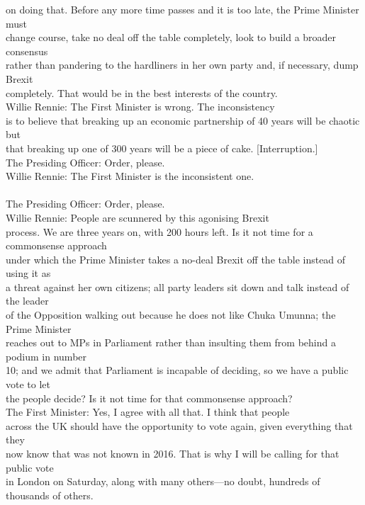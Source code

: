 \documentclass{article}
\begin{document}
\begin{description}
{on doing that. Before any more time passes and it is too late, the Prime Minister must\\
change course, take no deal off the table completely, look to build a broader consensus\\
rather than pandering to the hardliners in her own party and, if necessary, dump Brexit\\
completely. That would be in the best interests of the country.\\
Willie Rennie: The First Minister is wrong. The inconsistency\\
is to believe that breaking up an economic partnership of 40 years will be chaotic but\\
that breaking up one of 300 years will be a piece of cake. [Interruption.]\\
The Presiding Officer: Order, please.\\
Willie Rennie: The First Minister is the inconsistent one.\\
[Interruption.]\\
The Presiding Officer: Order, please.\\
Willie Rennie: People are scunnered by this agonising Brexit\\
process. We are three years on, with 200 hours left. Is it not time for a commonsense approach\\
under which the Prime Minister takes a no-deal Brexit off the table instead of using it as\\
a threat against her own citizens; all party leaders sit down and talk instead of the leader\\
of the Opposition walking out because he does not like Chuka Umunna; the Prime Minister\\
reaches out to MPs in Parliament rather than insulting them from behind a podium in number\\
10; and we admit that Parliament is incapable of deciding, so we have a public vote to let\\
the people decide? Is it not time for that commonsense approach?\\
The First Minister: Yes, I agree with all that. I think that people\\
across the UK should have the opportunity to vote again, given everything that they\\
now know that was not known in 2016. That is why I will be calling for that public vote\\
in London on Saturday, along with many others—no doubt, hundreds of thousands of others.\\
}
\end{description}
\end{document}
